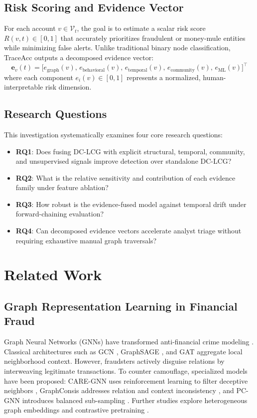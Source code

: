 \documentclass[journal]{IEEEtran}
\begin{document}
\subsection{Risk Scoring and Evidence Vector}
For each account $v \in \mathcal{V}_t$, the goal is to estimate a scalar risk score $R(v, t) \in [0, 1]$ that accurately prioritizes fraudulent or money-mule entities while minimizing false alerts. Unlike traditional binary node classification, TraceAcc outputs a decomposed evidence vector:
\begin{equation}
\mathbf{e}_v(t) = \big[ e_{\text{graph}}(v),\, e_{\text{behavioral}}(v),\, e_{\text{temporal}}(v),\, e_{\text{community}}(v),\, e_{\text{ML}}(v) \big]^\top
\end{equation}
where each component $e_i(v) \in [0, 1]$ represents a normalized, human-interpretable risk dimension.

\subsection{Research Questions}
This investigation systematically examines four core research questions:
\begin{itemize}
    \item \textbf{RQ1}: Does fusing DC-LCG with explicit structural, temporal, community, and unsupervised signals improve detection over standalone DC-LCG?
    \item \textbf{RQ2}: What is the relative sensitivity and contribution of each evidence family under feature ablation?
    \item \textbf{RQ3}: How robust is the evidence-fused model against temporal drift under forward-chaining evaluation?
    \item \textbf{RQ4}: Can decomposed evidence vectors accelerate analyst triage without requiring exhaustive manual graph traversals?
\end{itemize}

\section{Related Work}

\subsection{Graph Representation Learning in Financial Fraud}
Graph Neural Networks (GNNs) have transformed anti-financial crime modeling \cite{motie2024financial, ma2023comprehensive}. Classical architectures such as GCN \cite{kipf2017semi}, GraphSAGE \cite{hamilton2017inductive}, and GAT \cite{velickovic2018graph} aggregate local neighborhood context. However, fraudsters actively disguise relations by interweaving legitimate transactions. To counter camouflage, specialized models have been proposed: CARE-GNN uses reinforcement learning to filter deceptive neighbors \cite{dou2020enhancing}, GraphConsis addresses relation and context inconsistency \cite{liu2020alleviating}, and PC-GNN introduces balanced sub-sampling \cite{liu2021pick}. Further studies explore heterogeneous graph embeddings and contrastive pretraining \cite{chen2025adaptive, zhang2025finding, lu2024graph, zhao2024dyhdge}.
\end{document}
